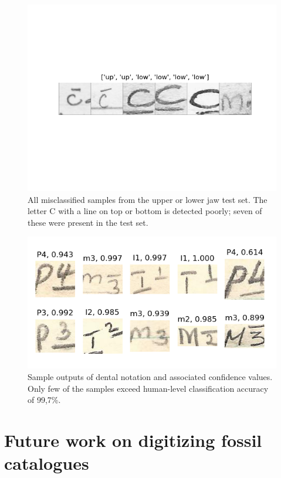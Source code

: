 \documentclass[english,twoside,openright]{UH_DS_MSc}
\begin{document}
\begin{figure}[ht]
    \centering
    \includegraphics*[scale=0.8]{images/misclassified_uplow.png}
    \caption{All misclassified samples from the upper or lower jaw test set. The letter C with a line on top or bottom is detected poorly; seven of these were present in the test set.}
    \label{image:misclassifications_uplow_in_test}
\end{figure}

\begin{figure}[ht]
    \centering
    \includegraphics*[scale=0.8]{images/inference.png}
    \caption{Sample outputs of dental notation and associated confidence values. Only few of the samples exceed human-level classification accuracy of 99,7\%.}
    \label{image:inference}
\end{figure}

\section{Future work on digitizing fossil catalogues}
\end{document}
